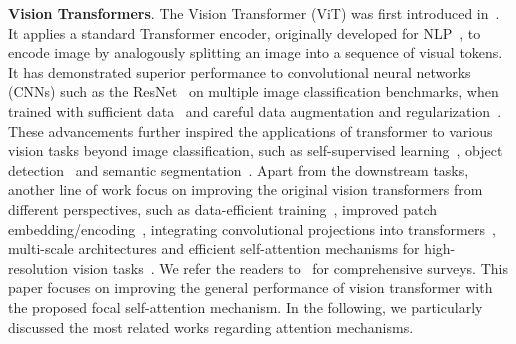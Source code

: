 \documentclass{article}
\begin{document}
\textbf{Vision Transformers}. The Vision Transformer (ViT) was first introduced in~\cite{dosovitskiy2020image}. It applies a standard Transformer encoder, originally developed for NLP~\cite{vaswani2017attention}, to encode image by analogously splitting an image into a sequence of visual tokens. It has demonstrated superior performance to convolutional neural networks (CNNs) such as the ResNet~\cite{he2016deep} on multiple image classification benchmarks, when trained with sufficient data~\cite{dosovitskiy2020image} and careful data augmentation and regularization~\cite{touvron2020training}. These advancements further inspired the applications of transformer to various vision tasks beyond image classification, such as self-supervised learning~\cite{chen2021empirical,caron2021emerging,li2021efficient}, object detection~\cite{carion2020end,zhu2020deformable,zheng2020end,dai2020up} and semantic segmentation~\cite{wang2020max,wang2020end,zheng2021rethinking}. Apart from the downstream tasks, another line of work focus on improving the original vision transformers from different perspectives, such as data-efficient training~\cite{touvron2020training}, improved patch embedding/encoding~\cite{chu2021conditional,yuan2021tokens,han2021transformer}, integrating convolutional projections into transformers~\cite{wu2021cvt,yuan2021incorporating}, multi-scale architectures and efficient self-attention mechanisms for high-resolution vision tasks~\cite{wang2021pyramid,wu2021cvt,liu2021swin,zhang2021multi,chu2021twins}. We refer the readers to~\cite{khan2021transformers,han2020survey,khan2021transformers} for comprehensive surveys. This paper focuses on improving the general performance of vision transformer with the proposed focal self-attention mechanism. In the following, we particularly discussed the most related works regarding attention mechanisms.
\end{document}

